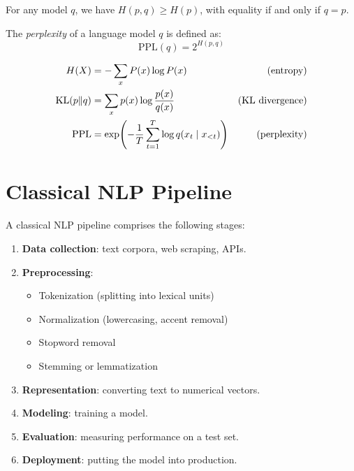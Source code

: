 \begin{proposition}
For any model $q$, we have $H(p, q) \geq H(p)$, with equality if and only if
$q = p$.
\end{proposition}

The \emph{perplexity} of a language model $q$ is defined as:
\[
\text{PPL}(q) = 2^{H(p, q)}
\]

\begin{keyformulas}[title=\textbf{Key Information-Theoretic Metrics}]
\begin{align}
H(X) &= -\sum_{x} P(x) \log P(x) & \text{(entropy)} \\
\mathrm{KL}(p \| q) &= \sum_{x} p(x) \log \frac{p(x)}{q(x)} & \text{(KL divergence)} \\
\text{PPL} &= \exp\!\left(-\frac{1}{T}\sum_{t=1}^{T} \log q(x_t \mid x_{<t})\right) & \text{(perplexity)}
\end{align}
\end{keyformulas}

\section{Classical NLP Pipeline}
\label{sec:intro:pipeline}

A classical NLP pipeline comprises the following stages:

\begin{enumerate}
    \item \textbf{Data collection}: text corpora, web scraping, APIs.
    \item \textbf{Preprocessing}:
    \begin{itemize}
        \item Tokenization (splitting into lexical units)
        \item Normalization (lowercasing, accent removal)
        \item Stopword removal
        \item Stemming or lemmatization
    \end{itemize}
    \item \textbf{Representation}: converting text to numerical vectors.
    \item \textbf{Modeling}: training a model.
    \item \textbf{Evaluation}: measuring performance on a test set.
    \item \textbf{Deployment}: putting the model into production.
\end{enumerate}

